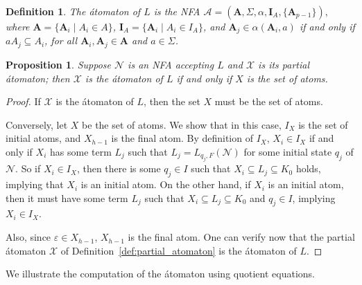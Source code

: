 \documentclass[preprint,12pt]{elsarticle}
\newcommand{\eps}{\varepsilon}
\newcommand{\Sig}{\Sigma}
\newcommand{\cA}{{\mathcal A}}
\newcommand{\cN}{{\mathcal N}}
\newcommand{\cX}{{\mathcal X}}
\newtheorem{proposition}{Proposition}
\newtheorem{definition}{Definition}
\begin{document}
\begin{definition}
\label{def:atomaton}
The \emph{\'atomaton} of $L$
 is the NFA $\cA=({\mathbf A},\Sig,\alpha, {\mathbf I}_A,\{{\mathbf A}_{p-1}\}),$
 where ${\mathbf A}=\{{\mathbf A}_i\mid A_i\in A\}$,
 ${\mathbf I}_A=\{{\mathbf A}_i\mid A_i\in I_A\}$, 
 and ${\mathbf A}_j \in \alpha({\mathbf A}_i, a)$ if and only if 
$aA_j \subseteq A_i$, for all ${\mathbf A_i},{\mathbf A_j}\in {\mathbf A}$ and 
$a\in\Sig$.
\end{definition}


\begin{proposition}
\label{prop:partial_atomaton}
Suppose $\cN$ is an NFA accepting $L$ and $\cX$ is its partial \'atomaton; 
then $\cX$  is the \'atomaton of $L$ if and only if $X$ is the set of atoms.
\end{proposition}
\begin{proof}
If $\cX$ is the \'atomaton of $L$, then the set $X$ must be the set of atoms.

Conversely, let $X$ be the set of atoms. 
We show that in this case, $I_X$ is the set of initial atoms, and 
$X_{h-1}$ is the final atom.
By definition of $I_X$, $X_i\in I_X$ if and only if $X_i$ has some term 
$L_j$ such that $L_j=L_{q_j,F}(\cN)$ for some initial state $q_j$ of $\cN$. 
So if $X_i\in I_X$, then there is some $q_j\in I$
such that $X_i\subseteq L_j\subseteq K_0$ holds, implying 
that $X_i$ is an initial atom.
On the other hand, if $X_i$ is an initial atom, then it must have some term
$L_j$ such that $X_i\subseteq L_j\subseteq K_0$ and $q_j\in I$, 
implying $X_i\in I_X$.

Also, since $\eps\in X_{h -1}$, $X_{h -1}$ is the final atom. 
One can verify now that the partial \'atomaton $\cX$ of 
Definition~\ref{def:partial_atomaton} is the \'atomaton of $L$. 
\end{proof}



We illustrate the computation of the \'atomaton using quotient equations.
\end{document}
